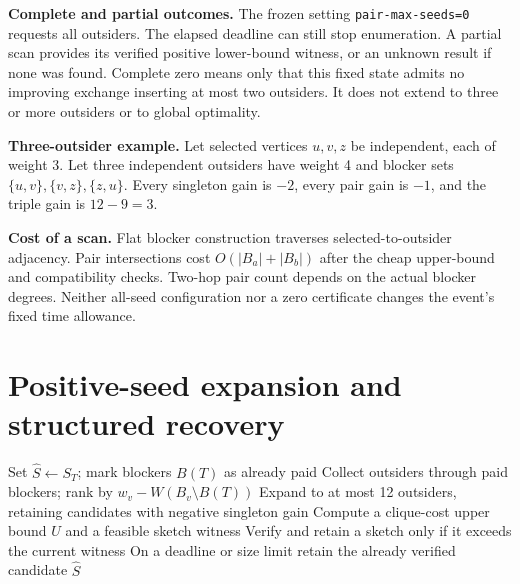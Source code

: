 \documentclass[10pt,a4paper]{article}
\begin{document}
\textbf{Complete and partial outcomes.}
The frozen setting \texttt{pair-max-seeds=0} requests all outsiders.
The elapsed deadline can still stop enumeration. A partial scan provides
its verified positive lower-bound witness, or an unknown result if none
was found. Complete zero means only that this fixed state admits no
improving exchange inserting at most two outsiders. It does not extend
to three or more outsiders or to global optimality.

\textbf{Three-outsider example.}
Let selected vertices $u,v,z$ be independent, each of weight 3. Let three
independent outsiders have weight 4 and blocker sets
$\{u,v\},\{v,z\},\{z,u\}$. Every singleton gain is $-2$, every pair
gain is $-1$, and the triple gain is $12-9=3$.

\textbf{Cost of a scan.}
Flat blocker construction traverses selected-to-outsider adjacency.
Pair intersections cost $O(|B_a|+|B_b|)$ after the cheap upper-bound
and compatibility checks. Two-hop pair count depends on the actual
blocker degrees. Neither all-seed configuration nor a zero certificate
changes the event's fixed time allowance.

\clearpage
\section*{Positive-seed expansion and structured recovery}
\begin{algorithm}[H]
Set $\widehat S\gets S_T$; mark blockers $B(T)$ as already paid\;
Collect outsiders through paid blockers; rank by $w_v-W(B_v\setminus B(T))$\;
Expand to at most 12 outsiders, retaining candidates with negative singleton gain\;
Compute a clique-cost upper bound $U$ and a feasible sketch witness\;
Verify and retain a sketch only if it exceeds the current witness\;
On a deadline or size limit retain the already verified candidate\;
\Return $\widehat S$\;
\caption{Positive-witness structured refinement}
\end{algorithm}
\end{document}
